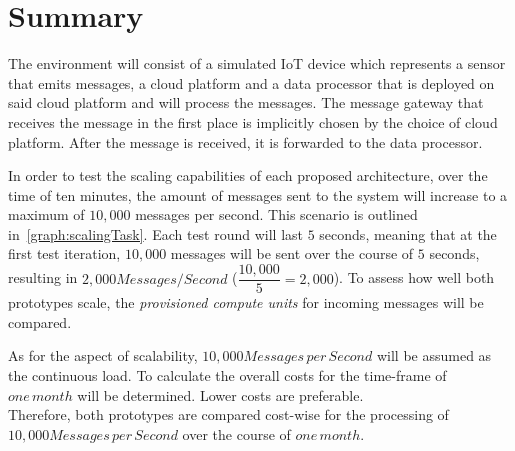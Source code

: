 \section{Summary}

The environment will consist of a simulated IoT device which represents a sensor that emits messages, a cloud platform and a data processor that is deployed on said cloud platform and will process the messages. The message gateway that receives the message in the first place is implicitly chosen by the choice of cloud platform. After the message is received, it is forwarded to the data processor.

In order to test the scaling capabilities of each proposed architecture, over the time of ten minutes, the amount of messages sent to the system will increase to a maximum of $10,000$ messages per second. This scenario is outlined in~\vref{graph:scalingTask}. Each test round will last $5$ seconds, meaning that at the first test iteration, $10,000$ messages will be sent over the course of $5$ seconds, resulting in $2,000Messages/Second$ ($\dfrac{10,000}{5}=2,000$).
To assess how well both prototypes scale, the \textit{provisioned compute units} for incoming messages will be compared. 

As for the aspect of scalability, $10,000 Messages\,per\,Second$ will be assumed as the continuous load. To calculate the overall costs for the time-frame of $one\,month$ will be determined. Lower costs are preferable.\\
Therefore, both prototypes are compared cost-wise for the processing of $10,000 Messages\,per\,Second$ over the course of $one\,month$. 